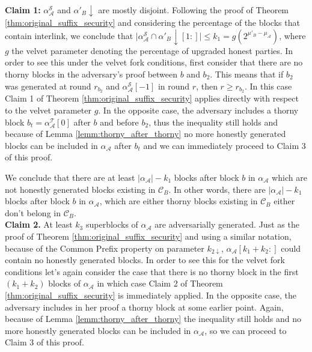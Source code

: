 \textbf{Claim 1:} $\alpha^{\mathcal{S}}_\mathcal{A}$ and
$\alpha'_B\downarrow$ are mostly disjoint. Following the proof of Theorem 
\ref{thm:original_suffix_security} and considering the percentage  of the blocks that contain interlink, we conclude that 
$\vert \alpha^{\mathcal{S}}_\mathcal{A} \cap \alpha'_B\downarrow[1:] \vert \leq k_{1} = g(2^{\mu'_B - \mu_\mathcal{A}})
$, where $g$ the velvet parameter denoting the percentage of upgraded honest parties. 
In order to see this under the velvet fork conditions, first consider that there are no thorny blocks in the adversary's proof between $b$ and $b_2$. This means that if $b_2$ was generated at round $r_{b_2}$ and $\alpha^{\mathcal{S}}_\mathcal{A}[-1]$ in round $r$, then $r \geq r_{b_2}$. In this case Claim 1 of
Theorem \ref{thm:original_suffix_security} applies directly with respect to the velvet parameter $g$. In the opposite case, the adversary includes a thorny block $b_t = \alpha^{\mathcal{T}}_{\mathcal{A}}[0]$ after $b$ and before $b_2$, thus the inequality still
holds and because of Lemma \ref{lemm:thorny_after_thorny} no more honestly generated blocks can be included
in $\alpha_\mathcal{A}$ after $b_t$ and we can immediately proceed to Claim 3 of this proof.

We conclude that there are at least $\vert\alpha_\mathcal{A}\vert - k_1$
blocks after block $b$ in $\alpha_\mathcal{A}$ which are not honestly generated blocks existing in
$\mathcal{C}_B$. In other words, there are $\vert \alpha_\mathcal{A} \vert - k_1$
blocks after block $b$ in $\alpha_\mathcal{A}$, which are either thorny blocks existing in $\mathcal{C}_B$ either don't belong in $\mathcal{C}_B$.\\

\textbf{Claim 2.} 
At least $k_3$ superblocks of $\alpha_\mathcal{A}$ are adversarially generated. Just as
the proof of Theorem \ref{thm:original_suffix_security} and using a similar notation, because of the Common Prefix
property on parameter $k_{2\downarrow}$, $\alpha_\mathcal{A}[k_{1}+k_{2}:]$ could contain
no honestly generated blocks. In order to see this for the velvet fork conditions
let's again consider the case that there is no thorny block in the first
$(k_1 + k_2)$ blocks of $\alpha_\mathcal{A}$ in which case Claim 2 of Theorem 
\ref{thm:original_suffix_security} is immediately applied. In the opposite case,
the adversary includes in her proof a
thorny block at some earlier point. Again, because of Lemma 
\ref{lemm:thorny_after_thorny} the inequality still holds and no more
honestly generated blocks can be included in $\alpha_\mathcal{A}$, so we can proceed to Claim 3
of this proof.\\


